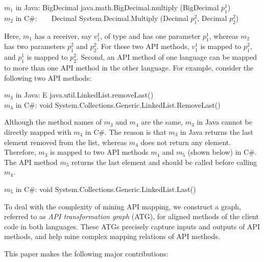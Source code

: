 \begin{CodeOut}
$m_1$ in Java: BigDecimal java.math.BigDecimal.multiply (BigDecimal $p_1^1$)\\
\hspace*{0.12in}$m_2$ in C\#:\ \ \ \  Decimal
System.Decimal.Multiply (Decimal $p_1^2$, Decimal $p_2^2$)
\end{CodeOut}

Here, $m_1$ has a receiver, say $v_1^1$, of type 
and has one parameter $p_1^1$, whereas $m_2$ has two parameters $p_1^2$
and $p_2^2$. For these two API methods, $v_1^1$ is
mapped to $p_1^2$, and $p_1^1$ is mapped to $p_2^2$. Second, an API
method of one language can be mapped to more than one API method in the
other language. For example, consider the following two API methods:

\begin{CodeOut}
$m_3$ in Java: E java.util.LinkedList.removeLast()\\
\hspace*{0.12in}$m_4$ in C\#: void System.Collections.Generic.LinkedList.RemoveLast()
\end{CodeOut}

Although the method names of $m_3$ and $m_4$ are the same, $m_3$ in Java
cannot be directly mapped with $m_4$ in C\#. The reason is that $m_3$ in Java
returns the last element removed from the list, whereas $m_4$ does not return any
element. Therefore, $m_3$ is mapped to two API methods $m_4$ and $m_5$ (shown below) in C\#.
The API method $m_5$ returns the last element and should be called before calling $m_4$.

\begin{CodeOut}
$m_5$ in C\#: void System.Collections.Generic.LinkedList.Last()
\end{CodeOut}

To deal with the complexity of mining API mapping, we construct a
graph, referred to as \emph{API transformation graph} (ATG), for
aligned methods of the client code in both languages. These ATGs
precisely capture inputs and outputs of API methods, and help mine
complex mapping relations of API methods.

This paper makes the following major contributions:

